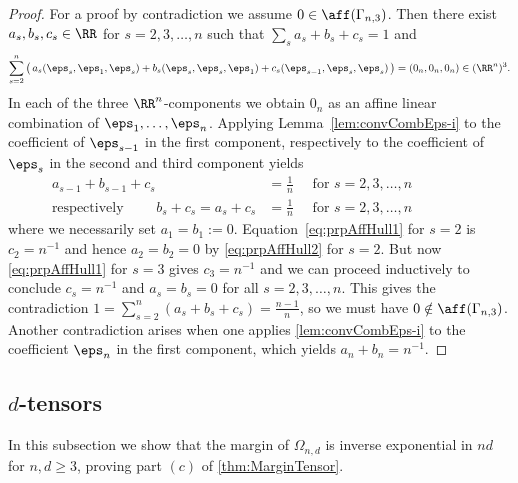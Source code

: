 \begin{proof}
For a proof by contradiction we assume $0 \in \aff(\Gamma_{n,3})$.  Then there exist $a_s, b_s, c_s \in \RR$ for $s=2,3,\ldots,n$ such that $\sum_s a_s + b_s + c_s = 1$ and
	\begin{align*}
	\sum_{s=2}^n \big( \, a_s (\eps_s, \eps_1, \eps_s) + b_s (\eps_s, \eps_s, \eps_1) + c_s (\eps_{s-1}, \eps_s, \eps_s) \, \big) = (0_n, 0_n, 0_n) \in (\RR^n)^3.
	\end{align*}
In each of the three $\RR^n$-components we obtain $0_n$ as an affine linear combination of $\eps_1, \ldots,\eps_n$.
Applying Lemma~\ref{lem:convCombEps-i} to the coefficient of $\eps_{s-1}$ in the first component,  respectively to the coefficient of $\eps_s$ in the second and third component yields
	\begin{align}
	a_{s-1} + b_{s-1} + c_{s} &= \frac{1}{n} \quad \text{ for } s=2,3,\ldots,n \label{eq:prpAffHull1} \\
	\text{respectively } \qquad
	b_s+ c_s = a_s + c_s &= \frac{1}{n} \quad \text{ for } s=2,3,\ldots,n  \qquad\qquad \label{eq:prpAffHull2}
 	\end{align}
where we necessarily set $a_1 = b_1 := 0$. Equation~\eqref{eq:prpAffHull1} for $s=2$ is $c_2 = n^{-1}$ and hence $a_2=b_2=0$ by \eqref{eq:prpAffHull2} for $s=2$. But now \eqref{eq:prpAffHull1} for $s=3$ gives $c_3 = n^{-1}$ and we can proceed inductively to conclude $c_s = n^{-1}$ and $a_s = b_s = 0$ for all $s=2,3,\ldots,n$.  This gives the contradiction $1 = \sum_{s=2}^n (a_s + b_s + c_s) = \frac{n-1}{n}$, so we must have $0 \notin \aff(\Gamma_{n,3})$. Another contradiction arises when one applies \cref{lem:convCombEps-i} to the coefficient $\eps_n$ in the first component, which yields $a_n + b_n = n^{-1}$.
\end{proof}



\subsection{$d$-tensors}\label{subsec:dTensors}
In this subsection we show that the margin of $\Omega_{n,d}$ is inverse exponential in $nd$ for $n, d \geq 3$, proving part $(c)$ of \cref{thm:MarginTensor}.


